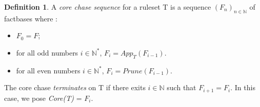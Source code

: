\documentclass{article}
\theoremstyle{proposal}
\theoremstyle{definition}
\newtheorem{definition}{Definition}[section]
\theoremstyle{theorem}
\def \N {\mathbb N}
\begin{document}
\begin{definition} 
A \emph{core chase sequence} for a ruleset T is a sequence $(F_n)_{n \in \N}$ of factbases where : 
\begin{itemize}
\item $F_0 = F$;
\item for all odd numbers $i \in \N^*$, $F_i = App_T(F_{i-1})$.
\item for all even numbers $i \in \N^*$, $F_i = Prune(F_{i-1})$.
\end{itemize}
The core chase \emph{terminates} on T if there exits $i \in \N$ such that $F_{i+1} = F_i$. In this case, we pose \emph{Core(T)} = $F_i$.
\end{definition} 
\end{document}
